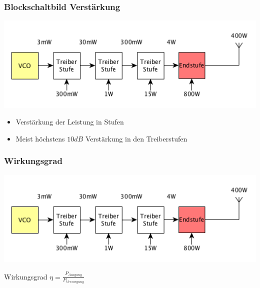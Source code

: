 \begin{frame}
    \frametitle{Blockschaltbild Verstärkung}
    \begin{center}
        \includegraphics[width=1\textwidth,height=.6\textheight,keepaspectratio]{a07/paBsb.png}
     	\begin{itemize}
			\item Verstärkung der Leistung in Stufen
			\item Meist höchstens $10dB$ Verstärkung in den Treiberstufen
    	\end{itemize}
    \end{center}
\end{frame}

\begin{frame}
    \frametitle{Wirkungsgrad}
    \begin{center}
        \includegraphics[width=1\textwidth,height=.5\textheight,keepaspectratio]{a07/paBsb.png} \huge
	\begin{block}{Wirkungsgrad}
			$\eta = \frac{P_{Ausgang}}{P_{Versorgung}}$
	\end{block}
    \end{center}
\end{frame}

